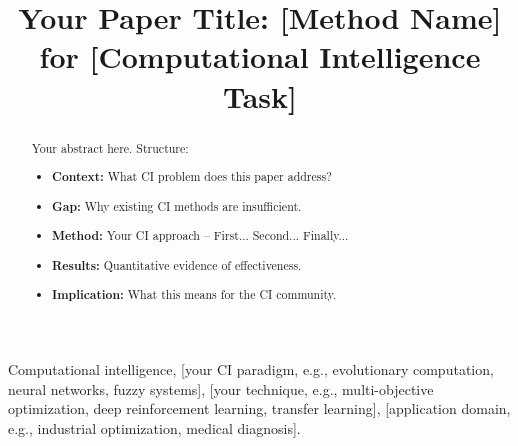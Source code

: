 \documentclass[journal,onecolumn,draftcls]{IEEEtran}
\begin{document}
\title{Your Paper Title: [Method Name] for [Computational Intelligence Task]}

\author{
}

\maketitle

\begin{abstract}

%

Your abstract here. Structure:
\begin{itemize}
  \item \textbf{Context:} What CI problem does this paper address?
  \item \textbf{Gap:} Why existing CI methods are insufficient.
  \item \textbf{Method:} Your CI approach -- First... Second... Finally...
  \item \textbf{Results:} Quantitative evidence of effectiveness.
  \item \textbf{Implication:} What this means for the CI community.
\end{itemize}

\end{abstract}

\begin{IEEEkeywords}
  Computational intelligence, [your CI paradigm, e.g., evolutionary computation,
  neural networks, fuzzy systems], [your technique, e.g., multi-objective
  optimization, deep reinforcement learning, transfer learning],
  [application domain, e.g., industrial optimization, medical diagnosis].
\end{IEEEkeywords}
\end{document}
